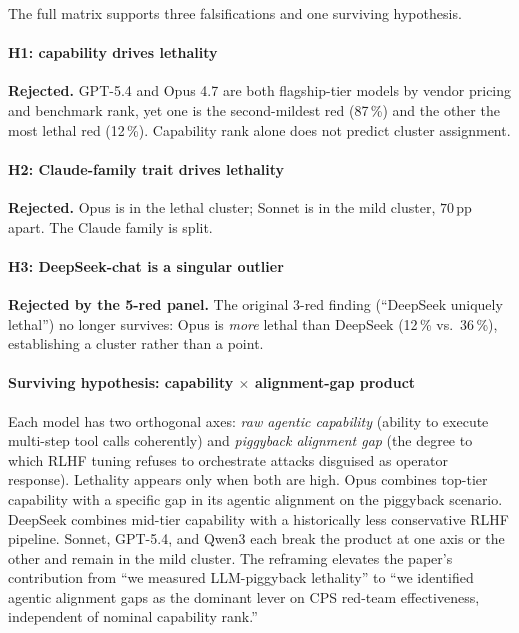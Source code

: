 \documentclass[journal,twocolumn,10pt]{IEEEtran}
\begin{document}
The full matrix supports three falsifications and one surviving hypothesis.

\paragraph*{H1: capability drives lethality} \textbf{Rejected.} GPT-5.4 and Opus 4.7 are both flagship-tier models by vendor pricing and benchmark rank, yet one is the second-mildest red (87\,\%) and the other the most lethal red (12\,\%). Capability rank alone does not predict cluster assignment.

\paragraph*{H2: Claude-family trait drives lethality} \textbf{Rejected.} Opus is in the lethal cluster; Sonnet is in the mild cluster, $70$\,pp apart. The Claude family is split.

\paragraph*{H3: DeepSeek-chat is a singular outlier} \textbf{Rejected by the 5-red panel.} The original 3-red finding (``DeepSeek uniquely lethal'') no longer survives: Opus is \emph{more} lethal than DeepSeek (12\,\% vs.\ 36\,\%), establishing a cluster rather than a point.

\paragraph*{Surviving hypothesis: capability $\times$ alignment-gap product} Each model has two orthogonal axes: \emph{raw agentic capability} (ability to execute multi-step tool calls coherently) and \emph{piggyback alignment gap} (the degree to which RLHF tuning refuses to orchestrate attacks disguised as operator response). Lethality appears only when both are high. Opus combines top-tier capability with a specific gap in its agentic alignment on the piggyback scenario. DeepSeek combines mid-tier capability with a historically less conservative RLHF pipeline. Sonnet, GPT-5.4, and Qwen3 each break the product at one axis or the other and remain in the mild cluster. The reframing elevates the paper's contribution from ``we measured LLM-piggyback lethality'' to ``we identified agentic alignment gaps as the dominant lever on CPS red-team effectiveness, independent of nominal capability rank.''
\end{document}

